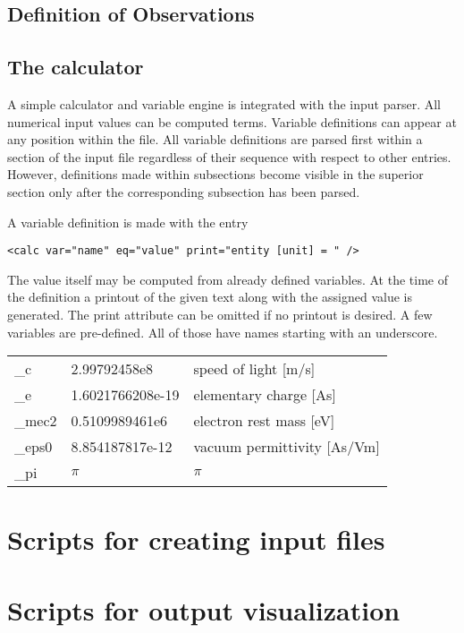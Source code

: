 \documentclass[11pt]{article}
\begin{document}

\subsection{Definition of Observations}


\subsection{The calculator}

A simple calculator and variable engine is integrated with
the input parser. All numerical input values can be computed terms.
Variable definitions can appear at any position within the file.
All variable definitions are parsed first within a section of the input file
regardless of their sequence with respect to other entries.
However, definitions made within subsections become visible in
the superior section only after the corresponding subsection has been parsed.

A variable definition is made with the entry
\begin{lstlisting}
<calc var="name" eq="value" print="entity [unit] = " />
\end{lstlisting}
The value itself may be computed from already defined variables.
At the time of the definition a printout of the given text along with the
assigned value is generated. The print attribute can be omitted if no printout is desired.
A few variables are pre-defined. All of those have names starting with an underscore.
\\[1ex]
\begin{tabular}{lll}
\_c & 2.99792458e8 & speed of light [m/s] \\
\_e & 1.6021766208e-19 & elementary charge [As] \\
\_mec2 & 0.5109989461e6 & electron rest mass [eV] \\
\_eps0 & 8.854187817e-12 & vacuum permittivity [As/Vm] \\
\_pi & $\pi$ & $\pi$ \\
\end{tabular}

\section{Scripts for creating input files}

\section{Scripts for output visualization}
\end{document}
